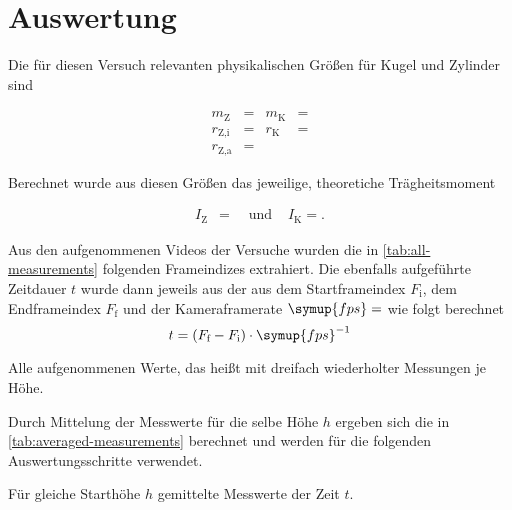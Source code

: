 \section{Auswertung}
\label{sec:Auswertung}


Die für diesen Versuch relevanten physikalischen Größen für Kugel und Zylinder sind 

\begin{align}
  \label{eq:physical-properties}
  m_\text{Z} &=  & m_\text{K} &= \nonumber\\
  r_{\text{Z},\text{i}} &=  & r_\text{K} &= \\
  r_{\text{Z},\text{a}} &=  &&\nonumber
\end{align}

Berechnet wurde aus diesen Größen das jeweilige, theoretiche Trägheitsmoment

\begin{align}
  \label{eq:moments-inertia}
  I_\text{Z} &= \quad\text{ und } & I_\text{K} = .
\end{align}



Aus den aufgenommenen Videos der Versuche wurden die in \autoref{tab:all-measurements} folgenden Frameindizes extrahiert.
Die ebenfalls aufgeführte Zeitdauer $t$ wurde dann jeweils aus der aus dem Startframeindex $F_\text{i}$,
dem Endframeindex $F_\text{f}$ und der Kameraframerate $\symup{fps}=$ wie folgt 
berechnet
\begin{equation*}
  t = (F_\text{f} - F_\text{i})\cdot\symup{fps}^{-1}
\end{equation*}

\begin{table}
  \centering
  \caption{Alle aufgenommenen Werte, das heißt mit dreifach wiederholter Messungen je Höhe.}
  \label{tab:all-measurements}
  
\end{table}

Durch Mittelung der Messwerte für die selbe Höhe $h$ ergeben sich die in 
\autoref{tab:averaged-measurements} berechnet und werden für die folgenden
Auswertungsschritte verwendet.


\begin{table}
  \centering
  \caption{Für gleiche Starthöhe $h$ gemittelte Messwerte der Zeit $t$.}
  \label{tab:averaged-measurements}
  
\end{table}


